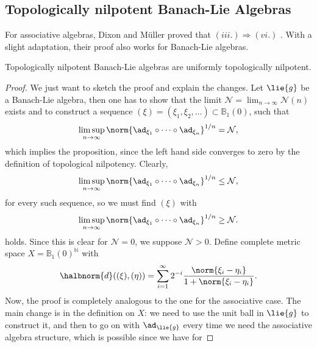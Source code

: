 \documentclass[
11pt,                          %
english                        %
]{article}
\begin{document}
\subsection{Topologically nilpotent Banach-Lie Algebras}
For associative algebras, Dixon and M\"uller proved that $(iii.) \Longrightarrow 
(vi.)$ \cite[Theorem 3]{dixon.mueller:1992a}. With a slight adaptation, their proof 
also works for Banach-Lie algebras.
\begin{proposition}
	\label{prop:top-nilpotency}
	Topologically nilpotent Banach-Lie algebras are uniformly topologically 
	nilpotent.
\end{proposition}
\begin{proof}
	We just want to sketch the proof and explain the changes.
	Let $\lie{g}$ be a Banach-Lie algebra, then one has to show that the limit 
	$\mathcal{N} = \lim_{n \rightarrow \infty} \mathcal{N}(n)$ exists and to 
	construct a sequence $(\xi) = (\xi_1, \xi_2, \ldots) \subset \mathbb{B}_1(0)$, 
	such that
	\begin{equation*}
		\limsup_{n \rightarrow \infty}
		\norm{\ad_{\xi_1} \circ \cdots \circ \ad_{\xi_n} }^{1/n}
		=
		\mathcal{N},
	\end{equation*}
	which implies the proposition, since the left hand side converges to zero by 
	the definition of topological nilpotency. Clearly,
	\begin{equation*}
		\limsup_{n \rightarrow \infty}
		\norm{\ad_{\xi_1} \circ \cdots \circ \ad_{\xi_n} }^{1/n}
		\leq
		\mathcal{N},
	\end{equation*}
	for every such sequence, so we must find $(\xi)$ with
	\begin{equation*}
		\limsup_{n \rightarrow \infty}
		\norm{\ad_{\xi_1} \circ \cdots \circ \ad_{\xi_n} }^{1/n}
		\geq
		\mathcal{N}.
	\end{equation*}
	holds. Since this is clear for $\mathcal{N} = 0$, we suppose $\mathcal{N} > 0$.
	Define complete metric space $X = \mathbb{B}_1(0)^{\mathbb{N}}$ with
	\begin{equation}
		\label{eq:metric-on-X}
		\halbnorm{d}((\xi), (\eta))
		=
		\sum\limits_{i = 1}^\infty
		2^{-i} \frac{\norm{\xi_i - \eta_i}}{1 + \norm{\xi_i - \eta_i}}.
	\end{equation}
	Now, the proof is completely analogous to the one for the associative case.
	The main change is in the definition on $X$: we need to use the unit ball in 
	$\lie{g}$ to construct it, and then to go on with $\ad_{\lie{g}}$ every time
	we need the associative algebra structure, which is possible since we have for 

\end{proof}
\end{document}
